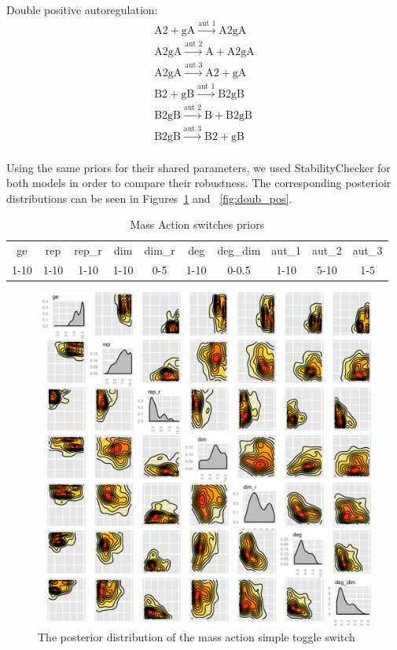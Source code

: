 Double positive autoregulation:
$$
\begin{array}{cccc} 
    \textrm{A2} + \textrm{gA} \stackrel{\textrm{aut 1}}{\longrightarrow} \textrm{A2gA} \\
    \textrm{A2gA} \stackrel{\textrm{aut 2}}{\longrightarrow} \textrm{A} + \textrm{A2gA}\\
    \textrm{A2gA} \stackrel{\textrm{aut 3}}{\longrightarrow} \textrm{A2}+ \textrm{gA}  \\
    \textrm{B2} + \textrm{gB} \stackrel{\textrm{aut 1}}{\longrightarrow} \textrm{B2gB} \\
    \textrm{B2gB} \stackrel{\textrm{aut 2}}{\longrightarrow} \textrm{B} + \textrm{B2gB}\\
    \textrm{B2gB} \stackrel{\textrm{aut 3}}{\longrightarrow} \textrm{B2}+ \textrm{gB}  \\
\end{array}
$$

Using the same priors for their shared parameters, we used StabilityChecker for both models in order to compare their robustness. The corresponding posterioir distributions can be seen in Figures~\ref{fig:det_std} and ~\ref{fig:doub_pos}.

\clearpage
\begin{table}[p]
\centering
\caption{Mass Action switches priors}
\label{tab:simp}
\begin{tabular}{cccccccccc}
ge   & rep  & rep\_r & dim  & dim\_r & deg & deg\_dim & aut\_1 & aut\_2 & aut\_3\\
1-10 & 1-10 & 1-10    & 1-10 & 0-5    & 1-10 & 0-0.5   &1-10&5-10&1-5
\end{tabular}
\end{table}


\begin{figure}[p]
\centering
\includegraphics[scale=0.7]{chapterModelling/images/posterior_ma_cl_bi.pdf}
\caption{The posterior distribution of the mass action simple toggle switch}
\label{fig:det_std}
\end{figure}


